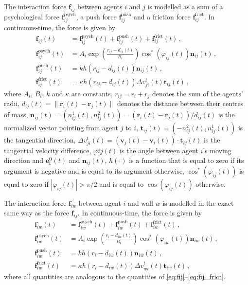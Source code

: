 The interaction force $\bm{f}_{ij}$ between agents $i$ and $j$ is modelled as a sum of a psychological force $\bm{f}_{ij}^{\mathrm{psych}}$, a push force $\bm{f}_{ij}^{\mathrm{push}}$ and a friction force $\bm{f}_{ij}^{\mathrm{frict}}$. In continuous-time, the force is given by
\begin{subequations}
\begin{align} 
	\bm{f}_{ij}(t) & = \bm{f}_{ij}^{\mathrm{psych}}(t) + \bm{f}_{ij}^{\mathrm{push}}(t) + \bm{f}_{ij}^{\mathrm{frict}}(t) \,, \label{eq:fij} \\
	\bm{f}_{ij}^{\mathrm{psych}}(t) & = A_i \exp\left(\frac{r_{ij}-d_{ij}(t)}{B_i}\right) \cos^*(\varphi_{ij}(t)) \bm{n}_{ij}(t) \,, \label{eq:fij_psych} \\
	\bm{f}_{ij}^{\mathrm{push}}(t) & = k h(r_{ij}-d_{ij}(t)) \bm{n}_{ij}(t) \,, \label{eq:fij_pusj} \\
	\bm{f}_{ij}^{\mathrm{frict}}(t) & = \kappa h(r_{ij}-d_{ij}(t)) \Delta v_{ji}^t(t) \bm{t}_{ij}(t) \,, \label{eq:fij_frict}
\end{align}
\end{subequations}
where $A_i$, $B_i$, $k$ and $\kappa$ are constants, $r_{ij}=r_i+r_j$ denotes the sum of the agents' radii, $d_{ij}(t)=\lVert \bm{r}_i(t)-\bm{r}_j(t) \rVert$ denotes the distance between their centres of mass, $\bm{n}_{ij}(t)=(n_{ij}^1(t),n_{ij}^2(t))=(\bm{r}_i(t)-\bm{r}_j(t))/d_{ij}(t)$ is the normalized vector pointing from agent $j$ to $i$, $\bm{t}_{ij}(t)=(-n_{ij}^2(t),n_{ij}^1(t))$ is the tangential direction, $\Delta v_{ji}^t(t)=(\bm{v}_j(t)-\bm{v}_i(t))\cdot\bm{t}_{ij}(t)$ is the tangential velocity difference, $\varphi{ij}(t)$ is the angle between agent $i$'s moving direction and $\bm{e_i^0}(t)$ and $\bm{n}_{ij}(t)$, $h(\cdot)$ is a function that is equal to zero if its argument is negative and is equal to its argument otherwise, $\cos^*(\varphi_{ij}(t))$ is equal to zero if $|\varphi_{ij}(t)| > \pi/2$ and is equal to $\cos(\varphi_{ij}(t))$ otherwise. 

The interaction force $\bm{f}_{iw}$ between agent $i$ and wall $w$ is modelled in the exact same way as the force $\bm{f}_{ij}$. In continuous-time, the force is given by
\begin{subequations}
\begin{align}
	\bm{f}_{iw}(t) & = \bm{f}_{iw}^{\mathrm{psych}}(t) + \bm{f}_{iw}^{\mathrm{push}}(t) + \bm{f}_{iw}^{\mathrm{frict}}(t) \,, \label{eq:fiw} \\
	\bm{f}_{iw}^{\mathrm{psych}}(t) & = A_i \exp\left(\frac{r_{i}-d_{iw}(t)}{B_i}\right) \cos^*(\varphi_{iw}(t)) \bm{n}_{iw}(t) \,, \label{eq:fiw_psych} \\
	\bm{f}_{iw}^{\mathrm{push}}(t) & = k h(r_{i}-d_{iw}(t)) \bm{n}_{iw}(t) \,, \label{eq:fiw_push} \\ 
	\bm{f}_{iw}^{\mathrm{frict}}(t) & = \kappa h(r_{i}-d_{iw}(t)) \Delta v_{wi}^t(t) \bm{t}_{iw}(t) \,, \label{eq:fiw_frict}
\end{align}
\end{subequations}
where all quantities are analogous to the quantities of \eqref{eq:fij}--\eqref{eq:fij_frict}.

